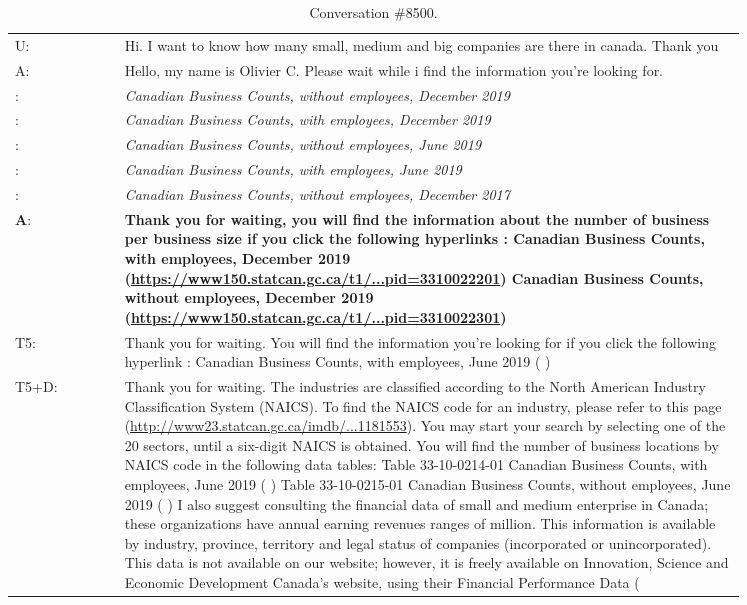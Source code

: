 \documentclass[11pt]{article}
\begin{document}
\begin{table*}[h]
    \small
    \centering
    \begin{tabular}{l p{0.85\linewidth}}
    \toprule
    U: & Hi. I want to know how many small, medium and big companies are there in canada. Thank you
    \\
    A: & Hello, my name is Olivier C. Please wait while i find the information you're looking for.
    \\
    
    : & \textit{Canadian Business Counts, without employees, December 2019}
    \\
    : & \textit{Canadian Business Counts, with employees, December 2019}
    \\
    : & \textit{Canadian Business Counts, without employees, June 2019}
    \\
    : & \textit{Canadian Business Counts, with employees, June 2019}
    \\
    : & \textit{Canadian Business Counts, without employees, December 2017}
    \\
    \midrule
    \textbf{A}: & \textbf{Thank you for waiting, you will find the information about the number of business per business size if you click the following hyperlinks : Canadian Business Counts, with employees, December 2019 (\href{https://www150.statcan.gc.ca/t1/tbl1/en/tv.action?pid=3310022201}{https://www150.statcan.gc.ca/t1/...pid=3310022201}) Canadian Business Counts, without employees, December 2019 (\href{https://www150.statcan.gc.ca/t1/tbl1/en/tv.action?pid=3310022301}{https://www150.statcan.gc.ca/t1/...pid=3310022301})}
    \\
    T5: & Thank you for waiting. You will find the information you're looking for if you click the following hyperlink : Canadian Business Counts, with employees, June 2019 ( )
    \\
    T5+D: & Thank you for waiting. The industries are classified according to the North American Industry Classification System (NAICS). To find the NAICS code for an industry, please refer to this page (\href{http://www23.statcan.gc.ca/imdb/p3VD.pl?Function=getVD&TVD=1181553}{http://www23.statcan.gc.ca/imdb/...1181553}). You may start your search by selecting one of the 20 sectors, until a six-digit NAICS is obtained. You will find the number of business locations by NAICS code in the following data tables: Table 33-10-0214-01 Canadian Business Counts, with employees, June 2019 ( ) Table 33-10-0215-01 Canadian Business Counts, without employees, June 2019 ( ) I also suggest consulting the financial data of small and medium enterprise in Canada; these organizations have annual earning revenues ranges of  million. This information is available by industry, province, territory and legal status of companies (incorporated or unincorporated). This data is not available on our website; however, it is freely available on Innovation, Science and Economic Development Canada's website, using their Financial Performance Data (
    \\
    \bottomrule
    \end{tabular}
    \caption{Conversation \#8500.}
    \label{tab:sample_conversation_8500}
\end{table*}
\end{document}
